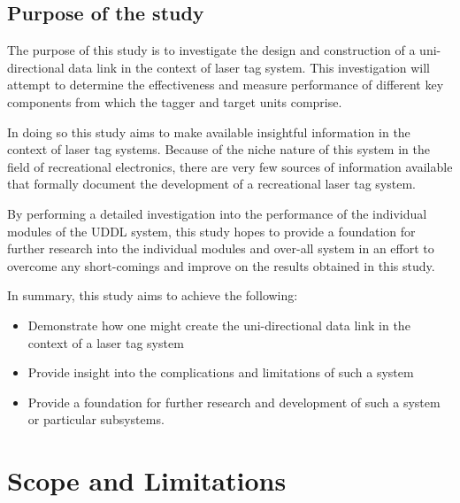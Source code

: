 \subsection{Purpose of the study}



The purpose of this study is to investigate the design and construction of a uni-directional data link in the context of laser tag system. This investigation will attempt to determine the effectiveness and measure performance of different key components from which the tagger and target units comprise.

In doing so this study aims to make available insightful information in the context of laser tag systems. Because of the niche nature of this system in the field of recreational electronics, there are very few sources of information available that formally document the development of a recreational laser tag system.

By performing a detailed investigation into the performance of the individual modules of the UDDL system, this study hopes to provide a foundation for further research into the individual modules and over-all system in an effort to overcome any short-comings and improve on the results obtained in this study.

In summary, this study aims to achieve the following:

\begin{itemize}
	\item Demonstrate how one might create the uni-directional data link in the context of a laser tag system
	\item Provide insight into the complications and limitations of such a system
	\item Provide a foundation for further research and development of such a system or particular subsystems.
\end{itemize}


\section{Scope and Limitations}

